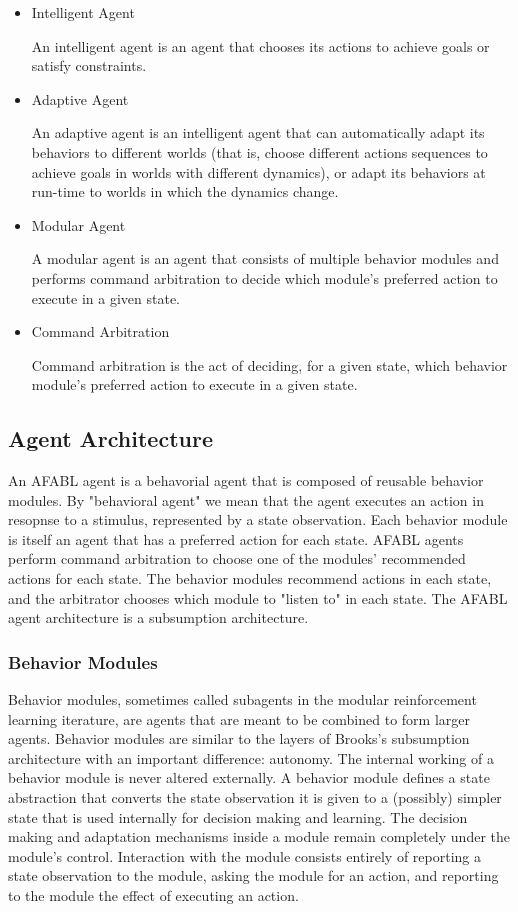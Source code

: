 \begin{itemize}
\item Intelligent Agent

  An intelligent agent is an agent that chooses its actions to achieve
  goals or satisfy constraints.

\item Adaptive Agent

  An adaptive agent is an intelligent agent that can automatically
  adapt its behaviors to different worlds (that is, choose different
  actions sequences to achieve goals in worlds with different
  dynamics), or adapt its behaviors at run-time to worlds in which the
  dynamics change.

\item Modular Agent

  A modular agent is an agent that consists of multiple behavior
  modules and performs command arbitration to decide which module's
  preferred action to execute in a given state.

\item Command Arbitration

  Command arbitration is the act of deciding, for a given state, which
  behavior module's preferred action to execute in a given state.
\end{itemize}

\subsection{Agent Architecture}

An AFABL agent is a behavorial agent that is composed of reusable
behavior modules.  By "behavioral agent" we mean that the agent
executes an action in resopnse to a stimulus, represented by a state
observation.  Each behavior module is itself an agent that has a
preferred action for each state.  AFABL agents perform command
arbitration to choose one of the modules' recommended actions for each
state.  The behavior modules recommend actions in each state, and the
arbitrator chooses which module to "listen to" in each state.  The
AFABL agent architecture is a subsumption architecture.

\subsubsection{Behavior Modules}

Behavior modules, sometimes called subagents in the modular
reinforcement learning iterature, are agents that are meant to be
combined to form larger agents.  Behavior modules are similar to the
layers of Brooks's subsumption architecture with an important
difference: autonomy.  The internal working of a behavior module is
never altered externally.  A behavior module defines a state
abstraction that converts the state observation it is given to a
(possibly) simpler state that is used internally for decision making
and learning.  The decision making and adaptation mechanisms inside a
module remain completely under the module's control.  Interaction with
the module consists entirely of reporting a state observation to the
module, asking the module for an action, and reporting to the module
the effect of executing an action.

